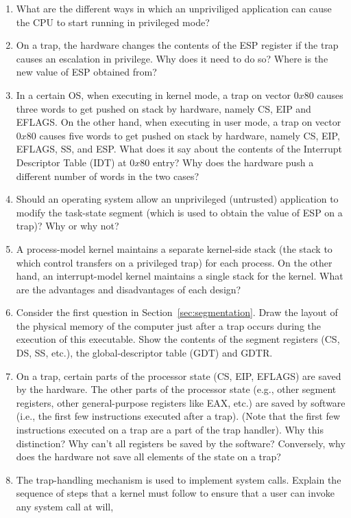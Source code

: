 \begin{enumerate}
\item What are the different ways in which an unpriviliged application can cause the CPU
to start running in privileged mode?
\item On a trap, the hardware changes the contents of the ESP register if the trap causes
an escalation in privilege. Why does it need to do so? Where is the new value of ESP obtained
from?
\item In a certain OS, when executing in kernel mode, a trap on vector
$0x80$ causes three words to get
pushed on stack by hardware, namely
CS, EIP and EFLAGS. On the other hand, when executing in user mode, a trap on vector
$0x80$ causes five
words to get pushed on stack by hardware, namely CS, EIP, EFLAGS, SS, and ESP.
What does it say about
the contents of the Interrupt Descriptor Table (IDT) at $0x80$ entry? Why does the hardware
push a different number of words in the two cases?
\item Should an operating system allow an unprivileged (untrusted) application to modify
the task-state segment (which is used to obtain the value of ESP on a trap)? Why or why not?
\item A process-model kernel maintains a separate kernel-side stack (the stack to which
control transfers on a privileged trap) for each process. On the other hand, an interrupt-model
kernel maintains a single stack for the kernel. What are the advantages and disadvantages of
each design?
\item Consider the first question in Section~\ref{sec:segmentation}. Draw the layout of the
physical memory of the computer just after a trap occurs during the execution of this
executable. Show the contents of the segment registers (CS, DS, SS, etc.), the global-descriptor
table (GDT) and GDTR.
\item On a trap, certain parts of the processor state (CS, EIP, EFLAGS) are saved by the hardware.
The other parts of the processor state (e.g., other segment registers, other general-purpose
registers like EAX, etc.) are saved by software (i.e., the first few instructions executed
after a trap). (Note that the first few instructions executed on a trap are a part of the
trap handler). Why this distinction? Why can't all registers be saved by the software? Conversely,
why does the hardware not save all elements of the state on a trap?
\item The trap-handling mechanism is used to implement system calls. Explain the sequence
of steps that a kernel must follow to ensure that a user can invoke any system call at will,

\end{enumerate}
